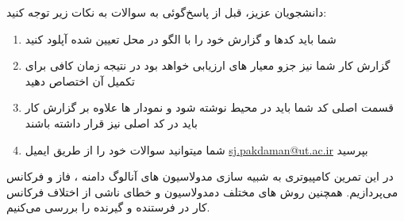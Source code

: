 \documentclass[14pt, professionalfont]{article}
\begin{document}
	{ \Large
		
		دانشجویان عزیز، قبل از پاسخ‌گوئی به سوالات به نکات زیر توجه کنید:
		\begin{enumerate}
			\item 
			شما باید کدها و گزارش خود را با الگو
			\:
			\:
			در محل تعیین شده آپلود کنید
			\item 
			گزارش کار شما نیز جزو معیار های ارزیابی خواهد بود در نتیجه زمان کافی	 برای تکمیل آن اختصاص دهید
			\item 
			
			قسمت اصلی کد شما باید در محیط 
			\:
			\:
			نوشته شود و نمودار ها علاوه‌ بر گزارش کار باید در کد اصلی نیز قرار داشته باشند

			\item 
			شما میتوانید سوالات خود را از طریق ایمیل
			\textcolor{blue}{
				\: 
				\href{mailto:sj.pakdaman@ut.ac.ir}{sj.pakdaman@ut.ac.ir}
				\:}
			بپرسید
		\end{enumerate}
	}
	
	\thispagestyle{empty}
	\clearpage
	\pagebreak
	در این تمرین کامپیوتری به شبیه سازی مدولاسیون های آنالوگ دامنه ، فاز و فرکانس می‌پردازیم. همچنین روش های مختلف دمدولاسیون و خطای ناشی از اختلاف فرکانس کار در فرستنده و گیرنده را بررسی می‌کنیم.
	
\end{document}
